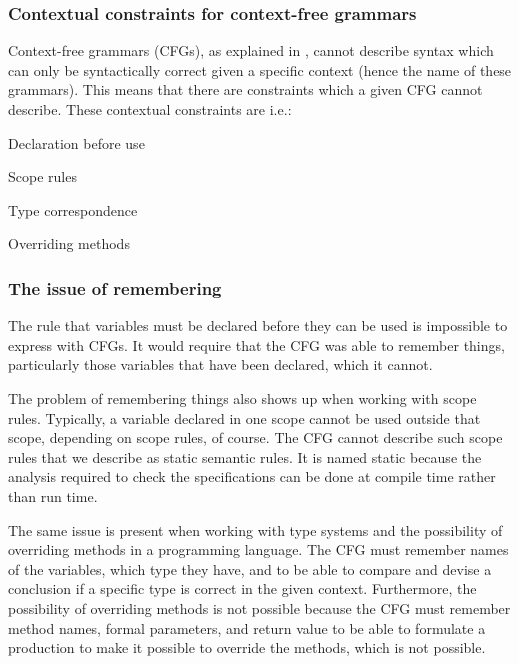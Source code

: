 \subsubsection{Contextual constraints for context-free grammars}
\label{sec:contextualconstraints}

Context-free grammars (CFGs), as explained in , 
cannot describe syntax which can only be
syntactically correct given a specific context (hence the name of these
grammars). This means that there are constraints which a given CFG cannot
describe.
These contextual constraints are i.e.\cite[p. 39]{plpp}:

\begin{dlist}
\item Declaration before use
\item Scope rules
\item Type correspondence
\item Overriding methods
\end{dlist}


\subsubsection*{The issue of remembering}

The rule that variables must be declared before they can be used is impossible
to express with CFGs. It would require that the CFG was able to remember things,
particularly those variables that have been declared, which it cannot. 

The problem of remembering things also shows up when working with
scope rules. Typically, a variable declared in one scope cannot be
used outside that scope, depending on scope rules, of course. The CFG
cannot describe such scope rules that we describe as static semantic
rules. It is named static because the analysis required to check the
specifications can be done at compile time rather than run time\cite[p. 153]{sebesta2013}.

The same issue is present when working with type systems and the
possibility of overriding methods in a programming language. The CFG
must remember names of the variables, which type they have, and to be
able to compare and devise a conclusion if a specific type is correct in
the given context. Furthermore, the possibility of overriding methods
is not possible because the CFG must remember method names, formal
parameters, and return value to be able to formulate a production to
make it possible to override the methods, which is not possible.

